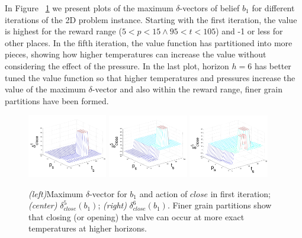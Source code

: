 \documentclass{article} %
\begin{document}
In Figure ~\ref{fig:3D}  we present plots of the maximum $\delta$-vectors of belief $b_1$ for different iterations of the 2D problem instance. %
Starting with the first iteration, the value is highest for the reward range ($5<p<15 \wedge 95<t<105$) and -1 or less for other places. In the fifth iteration, the value function has partitioned into more pieces, showing how higher temperatures can increase the value without considering the effect of the pressure. In the last plot, horizon $h=6$ has better tuned the value function so that higher temperatures and pressures increase the value of the maximum $\delta$-vector and also within the reward range, finer grain partitions have been formed. %
\begin{figure}[tbp!]
\centering
\includegraphics[width=0.31\textwidth]{pics/2d1-4.pdf}
\includegraphics[width=0.31\textwidth]{pics/2d9-4.pdf}
\includegraphics[width=0.31\textwidth]{pics/2d111-4.pdf}
\vspace{-3mm}
\caption{\footnotesize 
{\it (left)}Maximum $\delta$-vector for $b_1$ and action of $close$ in first iteration; 
{\it (center)} $\delta_{close}^5(b_1)$; 
{\it (right)} $\delta_{close}^6(b_1)$. Finer grain partitions show that closing (or opening) the valve can occur at more exact temperatures at higher horizons. 
}
\label{fig:3D}
\end{figure}
\end{document}
